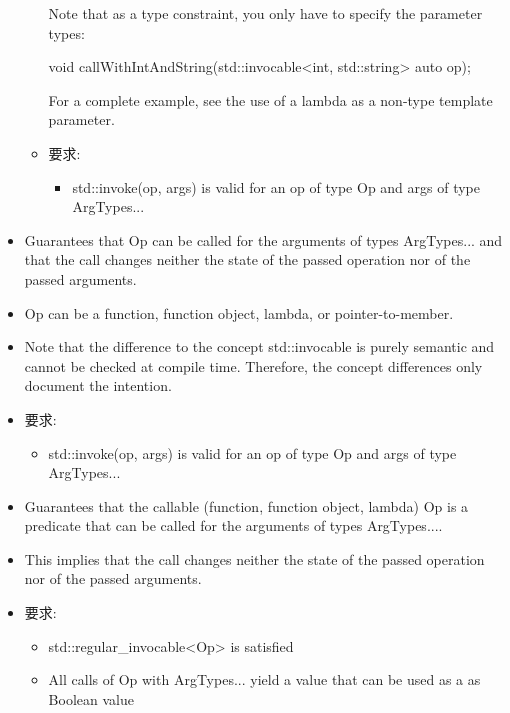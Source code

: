 \begin{itemize}
\begin{itemize}
Note that as a type constraint, you only have to specify the parameter types:

\begin{cpp}
void callWithIntAndString(std::invocable<int, std::string> auto op);
\end{cpp}

For a complete example, see the use of a lambda as a non-type template parameter.

\item
要求:
\begin{itemize}
\item
std::invoke(op, args) is valid for an op of type Op and args of type ArgTypes...
\end{itemize}
\end{itemize}
\end{itemize}


\begin{itemize}
\item
Guarantees that Op can be called for the arguments of types ArgTypes... and that the call changes neither the state of the passed operation nor of the passed arguments.

\item
Op can be a function, function object, lambda, or pointer-to-member.

\item
Note that the difference to the concept std::invocable is purely semantic and cannot be checked at compile time. Therefore, the concept differences only document the intention.

\item
要求:
\begin{itemize}
\item
std::invoke(op, args) is valid for an op of type Op and args of type ArgTypes...
\end{itemize}
\end{itemize}


\begin{itemize}
\item
Guarantees that the callable (function, function object, lambda) Op is a predicate that can be called for the arguments of types ArgTypes....

\item
This implies that the call changes neither the state of the passed operation nor of the passed arguments.

\item
要求:
\begin{itemize}
\item
std::regular\_invocable<Op> is satisfied

\item
 All calls of Op with ArgTypes... yield a value that can be used as a as Boolean value
\end{itemize}
\end{itemize}

